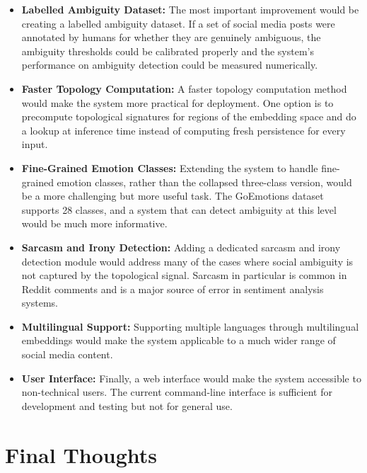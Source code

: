 \begin{itemize}
    \item \textbf{Labelled Ambiguity Dataset:} The most important improvement would be
    creating a labelled ambiguity dataset. If a set of social media posts were annotated by
    humans for whether they are genuinely ambiguous, the ambiguity thresholds could be
    calibrated properly and the system's performance on ambiguity detection could be
    measured numerically.

    \item \textbf{Faster Topology Computation:} A faster topology computation method would
    make the system more practical for deployment. One option is to precompute topological
    signatures for regions of the embedding space and do a lookup at inference time instead
    of computing fresh persistence for every input.

    \item \textbf{Fine-Grained Emotion Classes:} Extending the system to handle fine-grained
    emotion classes, rather than the collapsed three-class version, would be a more
    challenging but more useful task. The GoEmotions dataset supports 28 classes, and a
    system that can detect ambiguity at this level would be much more informative.

    \item \textbf{Sarcasm and Irony Detection:} Adding a dedicated sarcasm and irony
    detection module would address many of the cases where social ambiguity is not
    captured by the topological signal. Sarcasm in particular is common in Reddit comments
    and is a major source of error in sentiment analysis systems.

    \item \textbf{Multilingual Support:} Supporting multiple languages through multilingual
    embeddings would make the system applicable to a much wider range of social media
    content.

    \item \textbf{User Interface:} Finally, a web interface would make the system accessible
    to non-technical users. The current command-line interface is sufficient for development
    and testing but not for general use.
\end{itemize}

\section{Final Thoughts}


